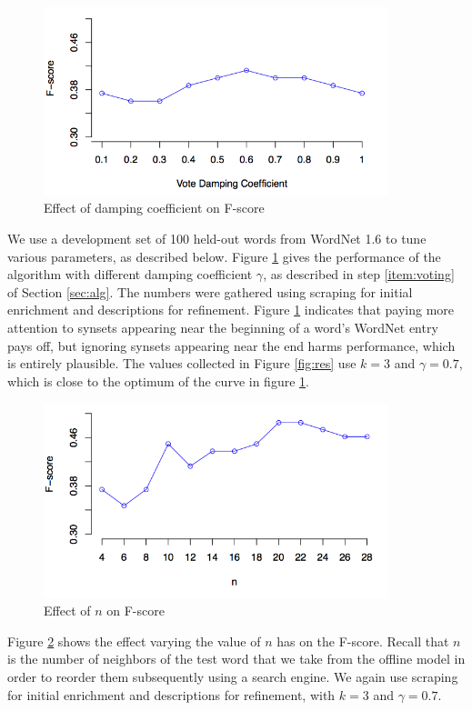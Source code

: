 \documentclass{article}
\begin{document}
\begin{figure}[hbtp]
\begin{center}
\includegraphics[width=100mm]{graphs/damping.png}
\end{center}
\caption{Effect of damping coefficient on F-score}
\label{fig:damping}
\end{figure}
We use a development set of 100 held-out words from WordNet 1.6 to tune various parameters, as described below.
Figure \ref{fig:damping} gives the performance of the algorithm with different damping coefficient $\gamma$, as described in step \ref{item:voting} of Section \ref{sec:alg}.
The numbers were gathered using scraping for initial enrichment and descriptions for refinement.
Figure \ref{fig:damping} indicates that paying more attention to synsets appearing near the beginning of a word's WordNet entry pays off, but ignoring synsets appearing near the end harms performance, which is entirely plausible.
The values collected in Figure \ref{fig:res} use $k=3$ and $\gamma=0.7$, which is close to the optimum of the curve in figure \ref{fig:damping}.

\begin{figure}[hbtp]
\begin{center}
\includegraphics[width=100mm]{graphs/n.png}
\end{center}
\caption{Effect of $n$ on F-score}
\label{fig:n}
\end{figure}
Figure \ref{fig:n} shows the effect varying the value of $n$ has on the F-score.
Recall that $n$ is the number of neighbors of the test word that we take from the offline model in order to reorder them subsequently using a search engine.
We again use scraping for initial enrichment and descriptions for refinement, with $k=3$ and $\gamma=0.7$.
\end{document}
